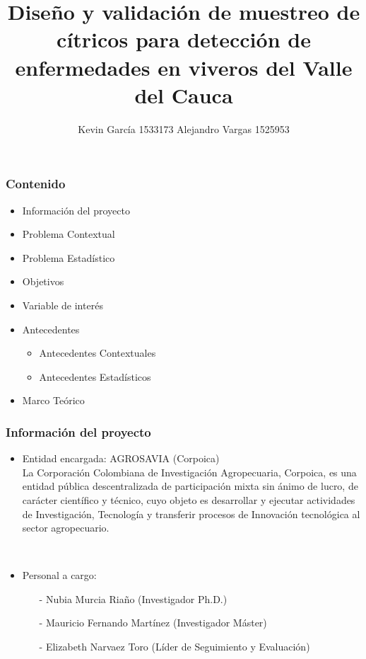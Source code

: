 \documentclass[11pt]{beamer}
\author[Kevin García - Alejandro Vargas]{Kevin García 1533173 \newline Alejandro Vargas 1525953}
\title[Anteproyecto]{Diseño y validación de muestreo de cítricos para detección de enfermedades en viveros del Valle del Cauca}
\begin{document}
\justify
\begin{frame}
\titlepage
\end{frame}


\begin{frame}
\frametitle{Contenido}
\begin{itemize}
\item Información del proyecto
\item Problema Contextual
\item Problema Estadístico
\item Objetivos
\item Variable de interés
\item Antecedentes
\begin{itemize}
\item Antecedentes Contextuales
\item Antecedentes Estadísticos
\end{itemize}
\item Marco Teórico
\end{itemize}
\end{frame}

\begin{frame}
\frametitle{Información del proyecto}
\begin{itemize}
\item Entidad encargada: AGROSAVIA (Corpoica)
~\\La Corporación Colombiana de Investigación Agropecuaria, Corpoica, es una entidad pública descentralizada de participación mixta sin ánimo de lucro, de carácter científico y técnico, cuyo objeto es desarrollar y ejecutar actividades de Investigación, Tecnología y transferir procesos de Innovación tecnológica al sector agropecuario.

~\\
\item Personal a cargo:
\begin{itemize}
\item[-]Nubia Murcia Riaño (Investigador Ph.D.)
\item[-]Mauricio Fernando Martínez (Investigador Máster)
\item[-]Elizabeth Narvaez Toro (Líder de Seguimiento y Evaluación)
\end{itemize}
\end{itemize}
\end{frame}
\end{document}

